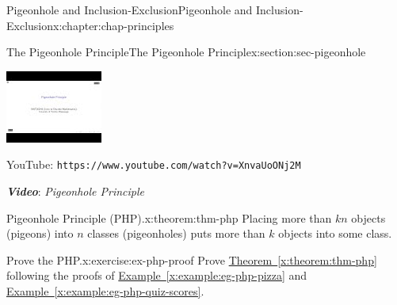 \documentclass[oneside,10pt,]{book}
\newcommand{\xreffont}{\relax}
\newcommand{\mono}[1]{\texttt{#1}}
\newcommand{\alert}[1]{\textbf{\textit{#1}}}
\numberwithin{equation}{section}
\newlength{\qrsize}
\newlength{\previewwidth}
\begin{document}
\begin{chapterptx}{Pigeonhole and Inclusion-Exclusion}{}{Pigeonhole and Inclusion-Exclusion}{}{}{x:chapter:chap-principles}
\begin{sectionptx}{The Pigeonhole Principle}{}{The Pigeonhole Principle}{}{}{x:section:sec-pigeonhole}
\begin{sidebyside}{1}{0}{0}{0}%
\begin{sbspanel}{1}%
\setlength{\qrsize}{9em}
\setlength{\previewwidth}{\linewidth}
\addtolength{\previewwidth}{-\qrsize}
\begin{tcbraster}[raster columns=2, raster column skip=1pt, raster halign=center, raster force size=false, raster left skip=0pt, raster right skip=0pt]%
\begin{tcolorbox}[previewstyle, width=\previewwidth]%
\includegraphics[width=0.80\linewidth,height=\qrsize,keepaspectratio]{images/video-pigeonhole.jpg}%
\end{tcolorbox}%
\begin{tcolorbox}[qrstyle]%
{\hypersetup{urlcolor=black}}%
\end{tcolorbox}%
\begin{tcolorbox}[captionstyle]%
\small YouTube: \mono{https://www.youtube.com/watch?v=XnvaUoONj2M}\end{tcolorbox}%
\end{tcbraster}%
\end{sbspanel}%
\end{sidebyside}%
\par
\alert{Video}: \emph{Pigeonhole Principle}%
\begin{theorem}{Pigeonhole Principle (PHP).}{}{x:theorem:thm-php}%
Placing more than \(kn\) objects (pigeons) into \(n\) classes (pigeonholes) puts more than \(k\) objects into some class.%
\end{theorem}
\begin{inlineexercise}{Prove the PHP.}{x:exercise:ex-php-proof}%
Prove \hyperref[x:theorem:thm-php]{Theorem~{\xreffont\ref{x:theorem:thm-php}}} following the proofs of \hyperref[x:example:eg-php-pizza]{Example~{\xreffont\ref{x:example:eg-php-pizza}}} and \hyperref[x:example:eg-php-quiz-scores]{Example~{\xreffont\ref{x:example:eg-php-quiz-scores}}}.%

\end{inlineexercise}
\end{sectionptx}
\end{chapterptx}
\end{document}
